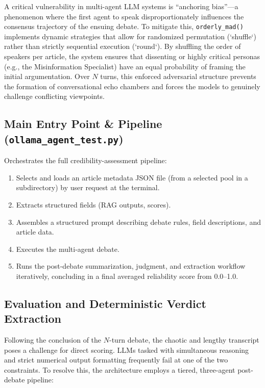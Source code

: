 \documentclass[sigconf,nonacm]{acmart}
\begin{document}
A critical vulnerability in multi-agent LLM systems is ``anchoring bias''—a phenomenon where the first agent to speak disproportionately influences the consensus trajectory of the ensuing debate. To mitigate this, \texttt{orderly\_mad()} implements dynamic strategies that allow for randomized permutation (`shuffle`) rather than strictly sequential execution (`round`). By shuffling the order of speakers per article, the system ensures that dissenting or highly critical personas (e.g., the Misinformation Specialist) have an equal probability of framing the initial argumentation. Over $N$ turns, this enforced adversarial structure prevents the formation of conversational echo chambers and forces the models to genuinely challenge conflicting viewpoints.

\subsection{Main Entry Point \& Pipeline (\texttt{ollama\_agent\_test.py})}\label{sec:pipeline}
Orchestrates the full credibility-assessment pipeline:
\begin{enumerate}
    \item Selects and loads an article metadata JSON file (from a selected pool in a subdirectory) by user request at the terminal.
    \item Extracts structured fields (RAG outputs, scores).
    \item Assembles a structured prompt describing debate rules, field descriptions, and article data.
    \item Executes the multi-agent debate.
    \item Runs the post-debate summarization, judgment, and extraction workflow iteratively, concluding in a final averaged reliability score from 0.0--1.0.
\end{enumerate}

\subsection{Evaluation and Deterministic Verdict Extraction}\label{sec:extraction}
Following the conclusion of the $N$-turn debate, the chaotic and lengthy transcript poses a challenge for direct scoring. LLMs tasked with simultaneous reasoning and strict numerical output formatting frequently fail at one of the two constraints. To resolve this, the architecture employs a tiered, three-agent post-debate pipeline:
\end{document}
